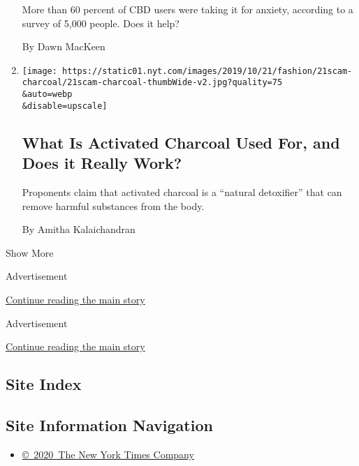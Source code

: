 \begin{enumerate}
  More than 60 percent of CBD users were taking it for anxiety,
  according to a survey of 5,000 people. Does it help?

  By Dawn MacKeen
\item
  \href{/2019/10/16/style/self-care/activated-charcoal-benefits.html}{}

  \texttt{[image: https://static01.nyt.com/images/2019/10/21/fashion/21scam-charcoal/21scam-charcoal-thumbWide-v2.jpg?quality=75\\\&auto=webp\\\&disable=upscale]}

  \hypertarget{what-is-activated-charcoal-used-for-and-does-it-really-work}{%
  \subsection{What Is Activated Charcoal Used For, and Does it Really
  Work?}\label{what-is-activated-charcoal-used-for-and-does-it-really-work}}

  Proponents claim that activated charcoal is a ``natural detoxifier''
  that can remove harmful substances from the body.

  By Amitha Kalaichandran
\end{enumerate}

Show More

Advertisement

\protect\hyperlink{after-mid1}{Continue reading the main story}

Advertisement

\protect\hyperlink{after-mktg}{Continue reading the main story}

\hypertarget{site-index}{%
\subsection{Site Index}\label{site-index}}

\hypertarget{site-information-navigation}{%
\subsection{Site Information
Navigation}\label{site-information-navigation}}

\begin{itemize}
\tightlist
\item
  \href{https://help.nytimes.com/hc/en-us/articles/115014792127-Copyright-notice}{©~2020~The
  New York Times Company}
\end{itemize}

